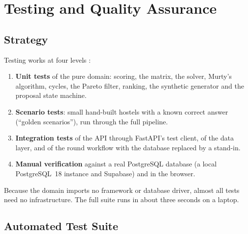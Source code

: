 
\chapter{Testing and Quality Assurance}
\label{ch:testing}

\section{Strategy}

Testing works at four levels \cite{pressman2014se}:

\begin{enumerate}
  \item \textbf{Unit tests} of the pure domain: scoring, the matrix, the
  solver, Murty's algorithm, cycles, the Pareto filter, ranking, the
  synthetic generator and the proposal state machine.
  \item \textbf{Scenario tests}: small hand-built hostels with a known
  correct answer (``golden scenarios''), run through the full pipeline.
  \item \textbf{Integration tests} of the API through FastAPI's test
  client, of the data layer, and of the round workflow with the database
  replaced by a stand-in.
  \item \textbf{Manual verification} against a real PostgreSQL database
  (a local PostgreSQL~18 instance and Supabase) and in the browser.
\end{enumerate}

Because the domain imports no framework or database driver, almost all
tests need no infrastructure. The full suite runs in about three seconds
on a laptop.

\section{Automated Test Suite}

